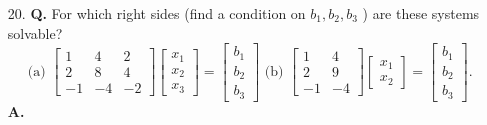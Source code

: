\documentclass[main.tex]{subfiles}
\begin{document}
\begin{enumerate}
    \item [20.] \textbf{Q.} For which right sides (find a condition on $b_{1}, b_{2}, b_{3}$ ) are these systems solvable?
    $$
    \text{ (a) } \left[\begin{array}{rrr}1 & 4 & 2 \\ 2 & 8 & 4 \\ -1 & -4 & -2\end{array}\right]\left[\begin{array}{l}x_{1} \\ x_{2} \\ x_{3}\end{array}\right]=\left[\begin{array}{l}b_{1} \\ b_{2} \\ b_{3}\end{array}\right]
    \text{ (b) } \left[\begin{array}{rr}1 & 4 \\ 2 & 9 \\ -1 & -4\end{array}\right]\left[\begin{array}{l}x_{1} \\ x_{2}\end{array}\right]=\left[\begin{array}{l}b_{1} \\ b_{2} \\ b_{3}\end{array}\right].
    $$
    \textbf{A.}
    $$
    \begin{aligned}
     \quad &{} \\
    & R_{2}-2 R_{1} \rightarrow R_{2}} \\
    &\left[\begin{array}{cccc}
    1 & 4 & 2 & b_{1} \\
    0 & 0 & 0 & b_{2}-2 b_{1} \\
    -1 & -4 & -2 & b_{3}
    \end{array}\right]\\
    & R_{1}+R_{3} \rightarrow R_{3}\\
    &\left[\begin{array}{cccc}
    1 & 4 & 2 & b_{1} \\
    0 & 0 & 0 & b_{2}-2 b_{1} \\

\end{array}
\end{aligned}$$
\end{enumerate}
\end{document}
